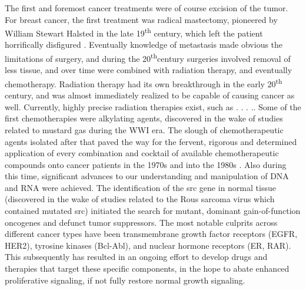 \documentclass[12pt]{article}
\begin{document}
The first and foremost cancer treatments were of course excision of the tumor. For breast cancer, the first treatment was radical mastectomy, pioneered by William Stewart Halsted in the late 19\textsuperscript{th} century, which left the patient horrifically disfigured \cite{Mukherjee2010}. Eventually knowledge of metastasis made obvious the limitations of surgery, and during the 20\textsuperscript{th}century surgeries involved removal of less tissue, and over time were combined with radiation therapy, and eventually chemotherapy. Radiation therapy had its own breakthrough in the early 20\textsuperscript{th} century, and was almost immediately realized to be capable of causing cancer as well. Currently, highly precise radiation therapies exist, such as . . . .. Some of the first chemotherapies were alkylating agents, discovered in the wake of studies related to mustard gas during the WWI era. The slough of chemotherapeutic agents isolated after that paved the way for the fervent, rigorous and determined application of every combination and cocktail of available chemotherapeutic compounds onto cancer patients in the 1970s and into the 1980s \cite{Mukherjee2010}. Also during this time, significant advances to our understanding and manipulation of DNA and RNA were achieved. The identification of the src gene in normal tissue (discovered in the wake of studies related to the Rous sarcoma virus which contained mutated src) initiated the search for mutant, dominant gain-of-function oncogenes and defunct tumor suppressors. The most notable culprits across different cancer types have been transmembrane growth factor receptors (EGFR, HER2), tyrosine kinases (Bcl-Abl), and nuclear hormone receptors (ER, RAR). This subsequently has resulted in an ongoing effort to develop drugs and therapies that target these specific components, in the hope to abate enhanced proliferative signaling, if not fully restore normal growth signaling. 
\end{document}
